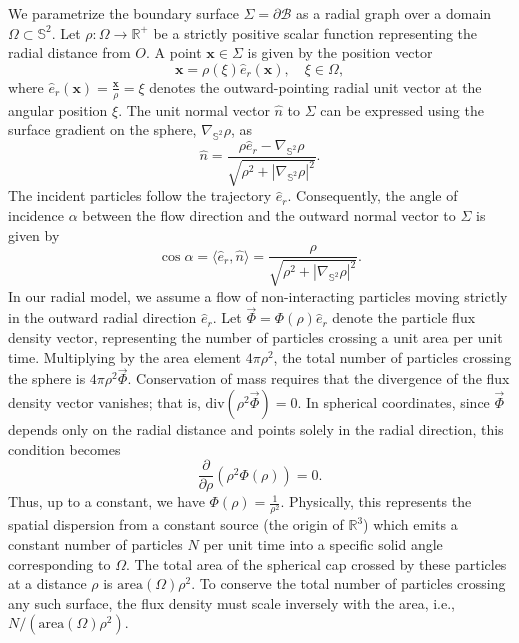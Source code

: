 \documentclass[a4paper,12pt]{amsart}
\theoremstyle{plain}
\theoremstyle{definition}
\def\r{\mathbb R}
\begin{document}
We parametrize the boundary surface $\Sigma=\partial\mathcal{B}$ as a radial graph over a domain $\Omega \subset \mathbb{S}^2$. Let $\rho\colon \Omega \to \mathbb{R}^+$ be a strictly positive scalar function representing the radial distance from $O$. A point $\mathbf{x}\in \Sigma$ is given by the position vector
\begin{equation}
 \mathbf{x}= \rho(\xi) \hat{e}_r( \mathbf{x}), \quad \xi \in \Omega,
\end{equation}
where $\hat{e}_r( \mathbf{x})=\frac{\mathbf{x}}{\rho}=\xi$ denotes the outward-pointing radial unit vector at the angular position $\xi$. 
The unit normal vector $\hat{n}$ to $\Sigma$ can be expressed using the surface gradient on the sphere, $\nabla_{\mathbb{S}^2} \rho$, as
\begin{equation*}
 \hat{n} = \frac{\rho \hat{e}_r - \nabla_{\mathbb{S}^2} \rho}{\sqrt{\rho^2 + |\nabla_{\mathbb{S}^2} \rho|^2}}.
\end{equation*}
The incident particles follow the trajectory $\hat{e}_r$. Consequently, the angle of incidence $\alpha$ between the flow direction and the outward normal vector to $\Sigma$ is given by
\begin{equation}\label{cc}
 \cos \alpha = \langle \hat{e}_r , \hat{n}\rangle = \frac{\rho}{\sqrt{\rho^2 + |\nabla_{\mathbb{S}^2} \rho|^2}}.
\end{equation}
In our radial model, we  assume a flow of non-interacting particles moving strictly in the outward radial direction $\hat{e}_r$. Let $\vec{\Phi}=\Phi(\rho)\hat{e}_r$ denote the particle flux density vector, representing the number of particles crossing a unit area per unit time. Multiplying by the area element $4\pi\rho^2$, the total number of particles crossing the sphere is $4\pi\rho^2 \vec{\Phi}$. Conservation of mass requires that the divergence of the flux density vector vanishes; that is, $\mbox{div}(\rho^2\vec{\Phi})= 0$. In spherical coordinates, since $\vec{\Phi}$ depends only on the radial distance and points solely in the radial direction, this condition becomes 
 $$ \frac{\partial}{\partial \rho} \left( \rho^2 \Phi(\rho) \right) = 0.$$
 Thus, up to a constant, we have $\Phi(\rho)=\frac{1}{\rho^2}$. Physically, this represents the spatial dispersion from a constant source (the origin of $\r^3$) which emits a constant number of particles $N$ per unit time into a specific solid angle corresponding to $\Omega$. The total area of the spherical cap crossed by these particles at a distance $\rho$ is $\mbox{area}( \Omega) \rho^2$. To conserve the total number of particles crossing any such surface, the flux density must scale inversely with the area, i.e., $N/ (\mbox{area}(\Omega) \rho^2)$.
\end{document}
